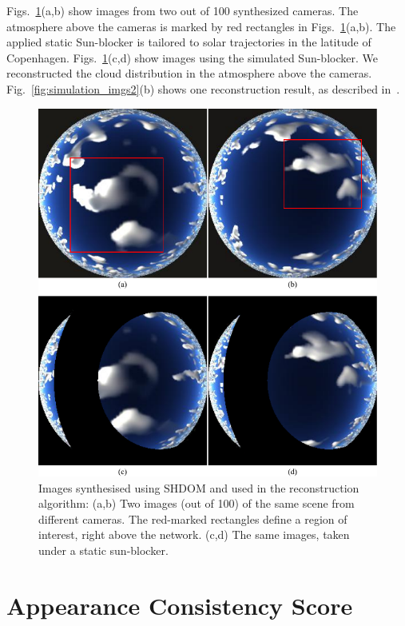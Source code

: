 \documentclass[runningheads]{llncs}
\begin{document}
Figs.~\ref{fig:simulation_imgs1}(a,b) show images from two out of 100
synthesized cameras. The atmosphere above the cameras is marked by red rectangles in Figs.~\ref{fig:simulation_imgs1}(a,b). The applied static Sun-blocker is tailored to solar trajectories in the latitude of Copenhagen. Figs.~\ref{fig:simulation_imgs1}(c,d) show images using the simulated Sun-blocker.
We reconstructed the cloud distribution in the atmosphere above the cameras. Fig.~\ref{fig:simulation_imgs2}(b) shows one reconstruction result, as described in~\cite{danny2014}.
\begin{figure}
  \begin{center}
    \includegraphics{figures/simulation_imgs}
    \caption{Images synthesised using SHDOM and used in the
      reconstruction algorithm: (a,b) Two images (out of 100) of the
      same scene from different cameras. The red-marked rectangles define
      a region of interest, right above the network. (c,d) The
      same images, taken under a static sun-blocker.}
    \label{fig:simulation_imgs1}
  \end{center}
\end{figure}


\section{Appearance Consistency Score}
\label{sec:appearancecore}
\end{document}
